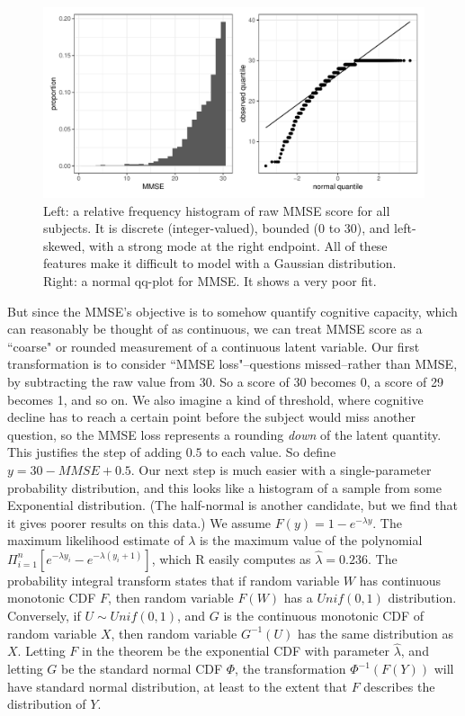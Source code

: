 \documentclass[12pt]{article}
\begin{document}
\begin{figure}[H]
\centering
\includegraphics[width=\linewidth]{figures/mmse_before}
\caption{Left: a relative frequency histogram of raw MMSE score for all subjects. It is discrete (integer-valued), bounded (0 to 30), and left-skewed, with a strong mode at the right endpoint. All of these features make it difficult to model with a Gaussian distribution. Right: a normal qq-plot for MMSE. It shows a very poor fit.}
\end{figure}

But since the MMSE's objective is to somehow quantify cognitive capacity, which can reasonably be thought of as continuous, we can treat MMSE score as a ``coarse" or rounded measurement of a continuous latent variable. Our first transformation is to consider ``MMSE loss"--questions missed--rather than MMSE, by subtracting the raw value from 30. So a score of 30 becomes 0, a score of 29 becomes 1, and so on. We also imagine a kind of threshold, where cognitive decline has to reach a certain point before the subject would miss another question, so the MMSE loss represents a rounding \textit{down} of the latent quantity. This justifies the step of adding $0.5$ to each value. So define $y = 30 - MMSE + 0.5$. Our next step is much easier with a single-parameter probability distribution, and this looks like a histogram of a sample from some Exponential distribution. (The half-normal is another candidate, but we find that it gives poorer results on this data.) We assume $F(y) = 1 - e^{-\lambda y}$. The maximum likelihood estimate of $\lambda$ is the maximum value of the polynomial $\Pi_{i=1}^{n}\left[ e^{-\lambda y_i} - e^{-\lambda (y_i + 1)} \right]$, which R easily computes as $\hat{\lambda} = 0.236$. The probability integral transform states that if random variable $W$ has continuous monotonic CDF $F$, then random variable $F(W)$ has a $Unif(0,1)$ distribution. Conversely, if $U \sim Unif(0,1)$, and $G$ is the continuous monotonic CDF of random variable $X$, then random variable $G^{-1}(U)$ has the same distribution as $X$. Letting $F$ in the theorem be the exponential CDF with parameter $\hat{\lambda}$, and letting $G$ be the standard normal CDF $\Phi$, the transformation $\Phi^{-1}(F(Y))$ will have standard normal distribution, at least to the extent that $F$ describes the distribution of $Y$. 
\end{document}
